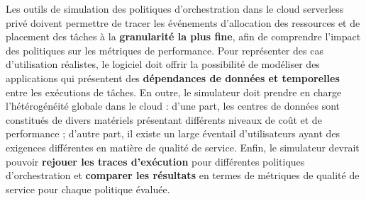 Les outils de simulation des politiques d'orchestration dans le cloud serverless privé doivent permettre de tracer les événements d'allocation des ressources et de placement des tâches à la \textbf{granularité la plus fine}, afin de comprendre l'impact des politiques sur les métriques de performance. Pour représenter des cas d'utilisation réalistes, le logiciel doit offrir la possibilité de modéliser des applications qui présentent des \textbf{dépendances de données et temporelles} entre les exécutions de tâches. En outre, le simulateur doit prendre en charge l'hétérogénéité globale dans le cloud : d'une part, les centres de données sont constitués de divers matériels présentant différents niveaux de coût et de performance ; d'autre part, il existe un large éventail d'utilisateurs ayant des exigences différentes en matière de qualité de service. Enfin, le simulateur devrait pouvoir \textbf{rejouer les traces d'exécution} pour différentes politiques d'orchestration et \textbf{comparer les résultats} en termes de métriques de qualité de service pour chaque politique évaluée.

